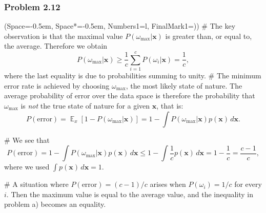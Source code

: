 \documentclass[12pt, a4paper]{article}
\newcommand{\listSpace}{-0.5em}%
\newcommand{\vect}[1]{\bm{#1}}
\DeclareMathOperator{\E}{\mathbb{E}}
\begin{document}
\subsubsection*{Problem 2.12}
\begin{easylist}[enumerate]
\ListProperties(Space=\listSpace, Space*=\listSpace, Numbers1=l, FinalMark1={)})
# The key observation is that the maximal value $P(\omega_{\text{max}} | \vect{x} )$ is greater than, or equal to, the average. Therefore we obtain
\begin{equation*}
	P(\omega_{\text{max}} | \vect{x} ) \geq \frac{1}{c} \sum_{i=1}^{c} P(\omega_i | \vect{x}) = \frac{1}{c},
\end{equation*}
where the last equality is due to probabilities summing to unity.
# The minimum error rate is achieved by choosing $\omega_{\text{max}}$, the most likely state of nature. 
The average probability of error over the data space is therefore the probability that $\omega_{\text{max}}$ is \emph{not} the true state of nature for a given $\vect{x}$, that is:
\begin{equation*}
	P(\text{error}) = \E_x \left[ 1 - P(\omega_{\text{max}} | \vect{x} ) \right] = 1 - \int P(\omega_{\text{max}} | \vect{x} ) p(\vect{x}) \, d \vect{x}.
\end{equation*}

# We see that
\begin{equation*}
	P(\text{error}) = 1 - \int P(\omega_{\text{max}} | \vect{x} ) p(\vect{x}) \, d \vect{x} \leq 1 - \int \frac{1}{c} p(\vect{x}) \, d \vect{x} = 1 - \frac{1}{c} = \frac{c-1}{c},
\end{equation*}
where we used $\int p(\vect{x}) \, d \vect{x} = 1$.


# A situation where $P(\text{error}) = (c-1)/c$ arises when $P(\omega_i) = 1/c$ for every $i$. Then the maximum value is equal to the average value, and the inequality in problem a) becomes an equality.
\end{easylist}
\end{document}
